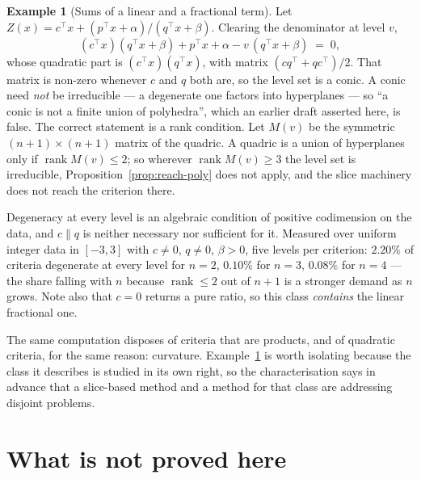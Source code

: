 \documentclass[11pt,a4paper]{article}
\newcommand{\Z}{Z}
\theoremstyle{plain}
\theoremstyle{definition}
\newtheorem{example}[theorem]{Example}
\begin{document}
\begin{example}[Sums of a linear and a fractional term]\label{ex:lplf}
Let $\Z(x) = c^{\top}x + (p^{\top}x + \alpha)/(q^{\top}x + \beta)$.  Clearing
the denominator at level $v$,
\[
  (c^{\top}x)(q^{\top}x + \beta) + p^{\top}x + \alpha
     - v\,(q^{\top}x + \beta) \;=\; 0 ,
\]
whose quadratic part is $(c^{\top}x)(q^{\top}x)$, with matrix
$(c q^{\top} + q c^{\top})/2$.  That matrix is non-zero whenever $c$ and $q$
both are, so the level set is a conic.  A conic need \emph{not} be
irreducible --- a degenerate one factors into hyperplanes --- so ``a conic is
not a finite union of polyhedra'', which an earlier draft asserted here, is
false.  The correct statement is a rank condition.  Let $M(v)$ be the
symmetric $(n+1) \times (n+1)$ matrix of the quadric.  A quadric is a union
of hyperplanes only if $\operatorname{rank} M(v) \leqslant 2$; so wherever
$\operatorname{rank} M(v) \geqslant 3$ the level set is irreducible,
Proposition~\ref{prop:reach-poly} does not apply, and the slice machinery
does not reach the criterion there.

Degeneracy at every level is an algebraic condition of positive codimension
on the data, and $c \parallel q$ is neither necessary nor sufficient for it.
Measured over uniform integer data in $[-3,3]$ with $c \neq 0$, $q \neq 0$,
$\beta > 0$, five levels per criterion: $2.20\%$ of criteria degenerate at
every level for $n = 2$, $0.10\%$ for $n = 3$, $0.08\%$ for $n = 4$ --- the
share falling with $n$ because $\operatorname{rank} \leqslant 2$ out of
$n+1$ is a stronger demand as $n$ grows.  Note also that $c = 0$ returns a
pure ratio, so this class \emph{contains} the linear fractional one.
\end{example}

\noindent
The same computation disposes of criteria that are products, and of quadratic
criteria, for the same reason: curvature.  Example~\ref{ex:lplf} is worth
isolating because the class it describes is studied in its own right, so the
characterisation says in advance that a slice-based method and a method for
that class are addressing disjoint problems.

\section{What is not proved here}
\end{document}
